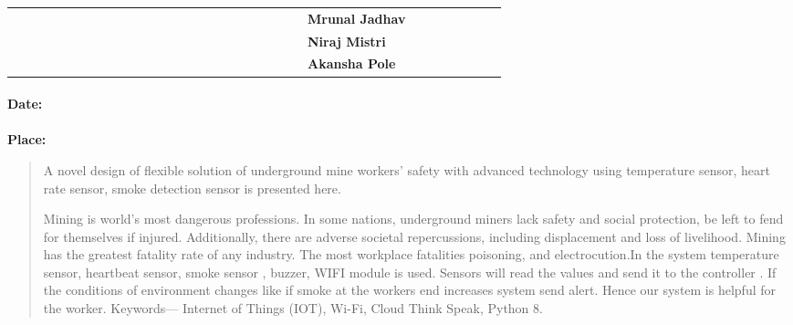 \documentclass[12pt,a4paper]{report}
\begin{document}
\noindent 
\begin{table}[h]
\large{}
\begin{tabular}{lllllllllllllllllllllllllllllll}
 &  &  &  &  &  &  &  &  &  &  &  &  &  &  &  &  &  &  &  &  &  &  &    \textbf{Mrunal Jadhav}    \\
 &  &  &  &  &  &  &  &  &  &  &  &  &  &  &  &  &  &  &  &  &  &  &     \textbf{Niraj Mistri} \\
 &  &  &  &  &  &  &  &  &  &  &  &  &  &  &  &  &  &  &  &  &  &  &   \textbf{Akansha Pole}  
\end{tabular}
\end{table}
\paragraph{}\textbf{Date:}
\paragraph{}\textbf{Place:}
\newpage

\tableofcontents
\listoffigures
\listoftables

\noindent
\newpage
\begin{abstract}



A novel design of flexible solution of underground mine workers' safety with advanced technology using temperature sensor, heart rate sensor, smoke detection sensor is presented here.

Mining is world's most dangerous professions. In some nations, underground miners lack safety and social protection, be left to fend for themselves if injured. Additionally, there are adverse societal repercussions, including displacement and loss of livelihood. Mining has the greatest fatality rate of any industry. The most workplace fatalities poisoning, and electrocution.In the system temperature sensor, heartbeat sensor, smoke sensor , buzzer, WIFI module is used. Sensors will read the values and send it to the controller . If the conditions of environment changes like if smoke at the workers end increases system send alert. Hence our system is helpful for the worker.
\newline
\noindent
\noindent    Keywords---\textbf{ }Internet of Things (IOT), Wi-Fi, Cloud Think Speak, Python 8.
\end{abstract}
\noindent 

\noindent 

\noindent 
\end{document}
